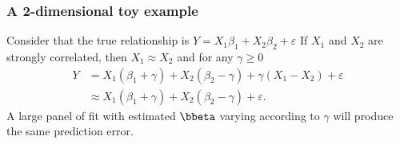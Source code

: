 \documentclass{beamer}\usepackage[]{graphicx}\usepackage[]{color}
\begin{document}
\begin{frame}
  \frametitle{A 2-dimensional toy example}

  Consider that the true relationship is $Y = X_1 \beta_1 + X_2\beta_2
  +  \varepsilon$ If  $X_1$ and  $X_2$ are  strongly  correlated, then
  $X_1\approx X_2$ and for any $\gamma\geq 0$
  \begin{align*}
    Y & = X_1 (\beta_1 + \gamma) + X_2 (\beta_2 - \gamma) +
    \gamma(X_1-X_2) + \varepsilon \\
    & \approx X_1 (\beta_1 + \gamma) + X_2 (\beta_2 - \gamma) + \varepsilon.
  \end{align*}
  A large  panel of fit  with estimated $\bbeta$ varying  according to
  $\gamma$ will produce the same prediction error.

  \vfill

\end{frame}
\end{document}
